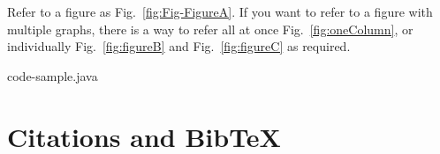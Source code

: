 \documentclass[10pt,journal,compsoc]{IEEEtran}
\newcommand{\reffig}[1]{Fig.~\ref{#1}}
\theoremstyle{plain}
\theoremstyle{definition}
\theoremstyle{remark}
\begin{document}
Refer to a figure as \reffig{fig:Fig-FigureA}.
If you want to refer to a figure with multiple graphs,
there is a way to refer all at once \reffig{fig:oneColumn},
or individually \reffig{fig:figureB} and \reffig{fig:figureC} as required.








	{code-sample.java}




\section{Citations and BibTeX}
\end{document}
